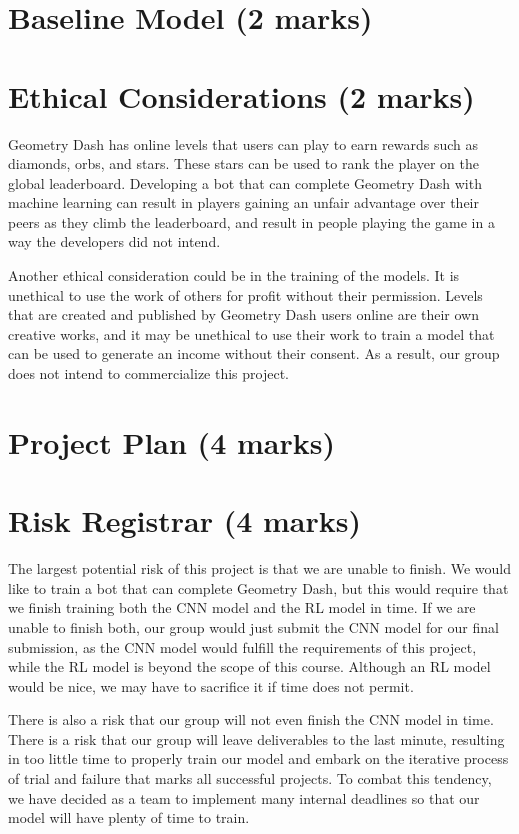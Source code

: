 \documentclass{article} %
\begin{document}
\section{Baseline Model (2 marks)}


\section{Ethical Considerations (2 marks)}
Geometry Dash has online levels that users can play to earn rewards 
such as diamonds, orbs, and stars. These stars can be used to rank 
the player on the global leaderboard. Developing a bot that can complete 
Geometry Dash with machine learning can result in players gaining an 
unfair advantage over their peers as they climb the leaderboard, and 
result in people playing the game in a way the developers did not intend.

Another ethical consideration could be in the training of the models. 
It is unethical to use the work of others for profit without their 
permission. Levels that are created and published by Geometry Dash 
users online are their own creative works, and it may be unethical to 
use their work to train a model that can be used to generate an income 
without their consent. As a result, our group does not intend to 
commercialize this project.


\section{Project Plan (4 marks)}

\section{Risk Registrar (4 marks)}
The largest potential risk of this project is that we are unable to 
finish. We would like to train a bot that can complete Geometry Dash, 
but this would require that we finish training both the CNN model and 
the RL model in time. If we are unable to finish both, our group would 
just submit the CNN model for our final submission, as the CNN model 
would fulfill the requirements of this project, while the RL model is 
beyond the scope of this course. Although an RL model would be nice, 
we may have to sacrifice it if time does not permit. 

There is also a risk that our group will not even finish the CNN model 
in time. There is a risk that our group will leave deliverables to the 
last minute, resulting in too little time to properly train our model 
and embark on the iterative process of trial and failure that marks all
successful projects. To combat this tendency, we have decided as a team 
to implement many internal deadlines so that our model will have plenty 
of time to train.
\end{document}
